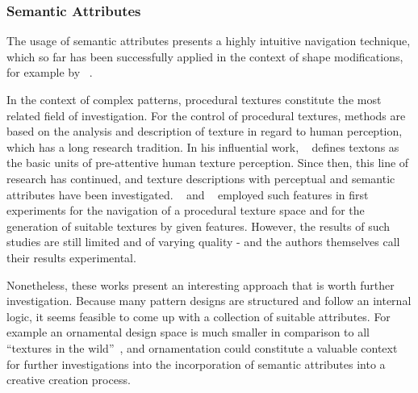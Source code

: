 
\subsubsection{Semantic Attributes}
\label{subsec:analysis_outlook_semantic-attributes}

The usage of semantic attributes presents a highly intuitive navigation technique, which so far has been successfully applied in the context of shape modifications, for example by \citeauthor*{yumer_2015_sse}~\cite{yumer_2015_sse}.

In the context of complex patterns, procedural textures constitute the most related field of investigation. For the control of procedural textures, methods are based on the analysis and description of texture in regard to human perception, which has a long research tradition. In his influential work, \citeauthor*{julesz_1981_tte}~\cite{julesz_1981_tte} defines textons as the basic units of pre-attentive human texture perception. Since then, this line of research has continued, and texture descriptions with perceptual \cite{liu_2015_vpp} and semantic~\cite{matthews_2013_eta,cimpoi_2014_dtw} attributes have been investigated. \citeauthor*{dong_2017_ptg}~\cite{dong_2017_ptg} and \citeauthor*{liu_2018_ppt}~\cite{liu_2018_ppt} employed such features in first experiments for the navigation of a procedural texture space and for the generation of suitable textures by given features. %
However, the results of such studies are still limited and of varying quality - and the authors themselves \cite{liu_2018_ppt} call their results experimental.

Nonetheless, these works present an interesting approach that is worth further investigation. Because many pattern designs are structured and follow an internal logic, it seems feasible to come up with a collection of suitable attributes. For example an ornamental design space is much smaller in comparison to all ``textures in the wild''~\cite{cimpoi_2014_dtw}, and ornamentation could constitute a valuable context for further investigations into the incorporation of semantic attributes into a creative creation process.


